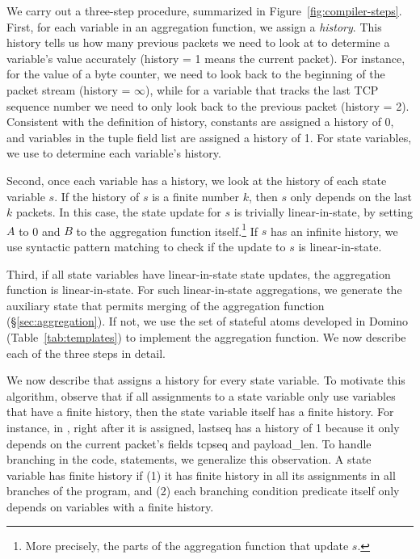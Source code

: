 We carry out a three-step procedure, summarized in
Figure~\ref{fig:compiler-steps}.  First, for each variable in an aggregation
function, we assign a {\em history}.  This history tells us how many previous
packets we need to look at to determine a variable's value accurately (history
= 1 means the current packet). For instance, for the value of a byte counter,
we need to look back to the beginning of the packet stream (history =
$\infty$), while for a variable that tracks the last TCP sequence number we
need to only look back to the previous packet (history = 2). Consistent with
the definition of history, constants are assigned a history of 0, and variables
in the tuple field list are assigned a history of 1. For state variables, we
use  to determine each variable's history.

Second, once each variable has a history, we look at the history of each state
variable $s$. If the history of $s$ is a finite number $k$, then $s$ only
depends on the last $k$ packets. In this case, the state update for $s$ is
trivially linear-in-state, by setting $A$ to 0 and $B$ to the aggregation
function itself.\footnote{More precisely, the parts of the aggregation function
that update $s$.} If $s$ has an infinite history, we use syntactic pattern
matching to check if the update to $s$ is linear-in-state.

Third, if all state variables have linear-in-state state updates, the
aggregation function is linear-in-state. For such linear-in-state aggregations,
we generate the auxiliary state that permits merging of the aggregation
function (\S\ref{sec:aggregation}). If not, we use the set of stateful atoms
developed in Domino (Table~\ref{tab:templates}) to implement the aggregation
function. We now describe each of the three steps in detail.

 We now describe  that
assigns a history for every state variable. To motivate this algorithm, observe
that if all assignments to a state variable only use variables that have a
finite history, then the state variable itself has a finite history. For
instance, in , right after it is assigned, {\ct
lastseq} has a history of 1 because it only depends on the current packet's
fields {\ct tcpseq} and {\ct payload\_len}. To handle branching in the code,
 statements, we generalize this observation. A
state variable has finite history if  (1) it has finite history in all its
assignments in all branches of the program, and (2) each branching condition
{\ct predicate} itself only depends on variables with a finite history.

